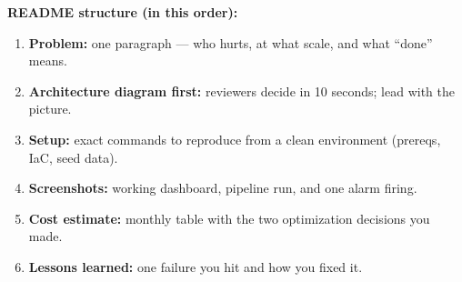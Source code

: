 \documentclass[11pt, a4paper]{article}
\begin{document}
\noindent\textbf{README structure (in this order):}
\begin{enumerate}[itemsep=1pt]
    \item \textbf{Problem:} one paragraph --- who hurts, at what scale, and what ``done'' means.
    \item \textbf{Architecture diagram first:} reviewers decide in 10 seconds; lead with the picture.
    \item \textbf{Setup:} exact commands to reproduce from a clean environment (prereqs, IaC, seed data).
    \item \textbf{Screenshots:} working dashboard, pipeline run, and one alarm firing.
    \item \textbf{Cost estimate:} monthly table with the two optimization decisions you made.
    \item \textbf{Lessons learned:} one failure you hit and how you fixed it.
\end{enumerate}
\end{document}
